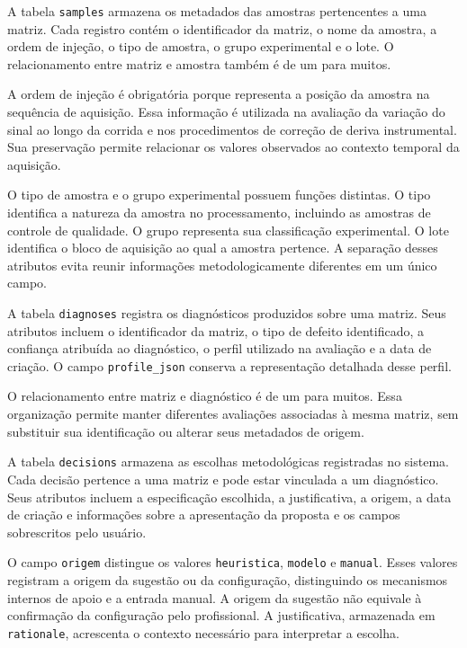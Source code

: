 A tabela \texttt{samples} armazena os metadados das amostras pertencentes a uma matriz. Cada registro contém o identificador da matriz, o nome da amostra, a ordem de injeção, o tipo de amostra, o grupo experimental e o lote. O relacionamento entre matriz e amostra também é de um para muitos.

A ordem de injeção é obrigatória porque representa a posição da amostra na sequência de aquisição. Essa informação é utilizada na avaliação da variação do sinal ao longo da corrida e nos procedimentos de correção de deriva instrumental. Sua preservação permite relacionar os valores observados ao contexto temporal da aquisição.

O tipo de amostra e o grupo experimental possuem funções distintas. O tipo identifica a natureza da amostra no processamento, incluindo as amostras de controle de qualidade. O grupo representa sua classificação experimental. O lote identifica o bloco de aquisição ao qual a amostra pertence. A separação desses atributos evita reunir informações metodologicamente diferentes em um único campo.

A tabela \texttt{diagnoses} registra os diagnósticos produzidos sobre uma matriz. Seus atributos incluem o identificador da matriz, o tipo de defeito identificado, a confiança atribuída ao diagnóstico, o perfil utilizado na avaliação e a data de criação. O campo \texttt{profile\_\allowbreak{}json} conserva a representação detalhada desse perfil.

O relacionamento entre matriz e diagnóstico é de um para muitos. Essa organização permite manter diferentes avaliações associadas à mesma matriz, sem substituir sua identificação ou alterar seus metadados de origem.

A tabela \texttt{decisions} armazena as escolhas metodológicas registradas no sistema. Cada decisão pertence a uma matriz e pode estar vinculada a um diagnóstico. Seus atributos incluem a especificação escolhida, a justificativa, a origem, a data de criação e informações sobre a apresentação da proposta e os campos sobrescritos pelo usuário.

O campo \texttt{origem} distingue os valores \texttt{heuristica}, \texttt{modelo} e \texttt{manual}. Esses valores registram a origem da sugestão ou da configuração, distinguindo os mecanismos internos de apoio e a entrada manual. A origem da sugestão não equivale à confirmação da configuração pelo profissional. A justificativa, armazenada em \texttt{rationale}, acrescenta o contexto necessário para interpretar a escolha.

